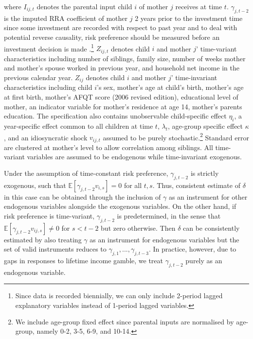 \documentclass[emulatestandardclasses, 10pt, abstract = true]{scrartcl}
\begin{document}
where $I_{ij,t}$ denotes the parental input child $i$ of mother $j$ receives at time $t$. $\gamma_{j,t-2}$ is the imputed RRA coefficient of mother $j$ 2 years prior to the investment time since some investment are recorded with respect to past year and to deal with potential reverse causality, risk preference should be measured before an investment decision is made \citet{hartog2002linking}.\footnote{Since data is recorded biennially, we can only include 2-period lagged explanatory variables instead of 1-period lagged variables.} $Z_{ij,t}$ denotes child $i$ and mother $j$' time-variant characteristics including number of siblings, family size, number of weeks mother and mother's spouse worked in previous year, and household net income in the previous calendar year. $Z_{ij}$ denotes child $i$ and mother $j$' time-invariant characteristics including child $i$'s sex, mother's age at child's birth, mother's age at first birth, mother's AFQT score (2006 revised edition), educational level of mother, an indicator variable for mother's residence at age 14, mother's parents education. The specification also contains unobservable child-specific effect $\eta_i$, a year-specific effect common to all children at time $t$, $\lambda_t$, age-group specific effect $\kappa$, and an idiosyncratic shock $v_{ij,t}$ assumed to be purely stochastic.\footnote{We include age-group fixed effect since parental inputs are normalised by age-group, namely 0-2, 3-5, 6-9, and 10-14.} Standard error are clustered at mother's level to allow correlation among siblings. All time-variant variables are assumed to be endogenous while time-invariant exogenous.

Under the assumption of time-constant risk preference, $\gamma_{j,t-2}$ is strictly exogenous, such that $\mathbb E[\gamma_{j,t-2}v_{i,s}]=0$ for all $t,s$. Thus, consistent estimate of $\delta$ in this case can be obtained through the inclusion of $\gamma$ as an instrument for other endogenous variables alongside the exogenous variables. On the other hand, if risk preference is time-variant, $\gamma_{j,t-2}$ is predetermined, in the sense that $\mathbb E[\gamma_{j,t-2}v_{ij,s}]\ne 0$ for $s<t-2$ but zero otherwise. Then $\delta$ can be consistently estimated by also treating $\gamma$ as an instrument for endogenous variables but the set of valid instruments reduces to $\gamma_{j,1},...,\gamma_{j,t-3}$. In practice, however, due to gaps in responses to lifetime income gamble, we treat $\gamma_{j,t-2}$ purely as an endogenous variable.
\end{document}
